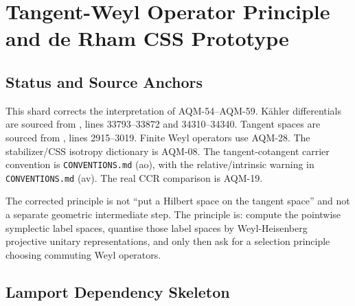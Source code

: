 
\section{Tangent-Weyl Operator Principle and de Rham CSS Prototype}
\label{sec:tangent-weyl-operator-principle}

\subsection{Status and Source Anchors}

\begin{sloppypar}
This shard corrects the interpretation of AQM-54--AQM-59.  K\"ahler
differentials are sourced from
, lines
33793--33872 and 34310--34340.  Tangent spaces are sourced from
, lines
2915--3019.  Finite Weyl operators use AQM-28.  The stabilizer/CSS isotropy
dictionary is AQM-08.  The tangent-cotangent carrier convention is
\texttt{CONVENTIONS.md} (ao), with the relative/intrinsic warning in
\texttt{CONVENTIONS.md} (av).  The real CCR comparison is AQM-19.
\end{sloppypar}

The corrected principle is not ``put a Hilbert space on the tangent space'' and
not a separate geometric intermediate step.  The principle is: compute the
pointwise symplectic label spaces, quantise those label spaces by
Weyl-Heisenberg projective unitary representations, and only then ask for a
selection principle choosing commuting Weyl operators.

\subsection{Lamport Dependency Skeleton}

